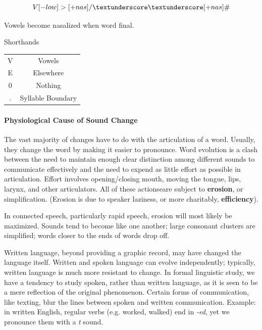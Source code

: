 \documentclass{exam}
\newcommand{\morespace}{\vspace{+2mm}}
\begin{document}
$$V[-low] > [+nas]/ \textunderscore\textunderscore [+nas]\#$$


\begin{center}
Vowels become nasalized when word final. 
\end{center}


\begin{center}

Shorthands \morespace

\begin{tabular}{c|c}
     V&Vowels  \\
     E&Elsewhere\\
     0&Nothing\\
     .&Syllable Boundary\\
\end{tabular}
\end{center}



\paragraph{Physiological Cause of Sound Change} The vast majority of changes have to do with the articulation of a word. 
Usually, they change the word by making it easier to pronounce. 
Word evolution is a clash between the need to maintain enough clear distinction among different sounds to communicate effectively and the need to expend as little effort as possible in articulation. 
Effort involves opening/closing mouth, moving the tongue, lips, larynx, and other articulators. 
All of these actionseare subject to \textbf{erosion}, or simplification. 
(Erosion is due to speaker laziness, or more charitably, \textbf{efficiency}). 

In connected speech, particularly rapid speech, erosion will most likely be maximized. 
Sounds tend to become like one another; large consonant clusters are simplified; words closer to the ends of words drop off. 

Written language, beyond providing a graphic record, may have changed the language itself. Written and spoken language can evolve independently; typically, written language is much more resistant to change. In formal linguistic study, we have a tendency to study spoken, rather than written language, as it is seen to be a mere reflection of the original phenomenon. Certain forms of communication, like texting, blur the lines between spoken and written communication. Example: in written English, regular verbs (e.g. worked, walked) end in \textit{-ed}, yet we pronounce them with a \textit{t} sound. 
\end{document}
